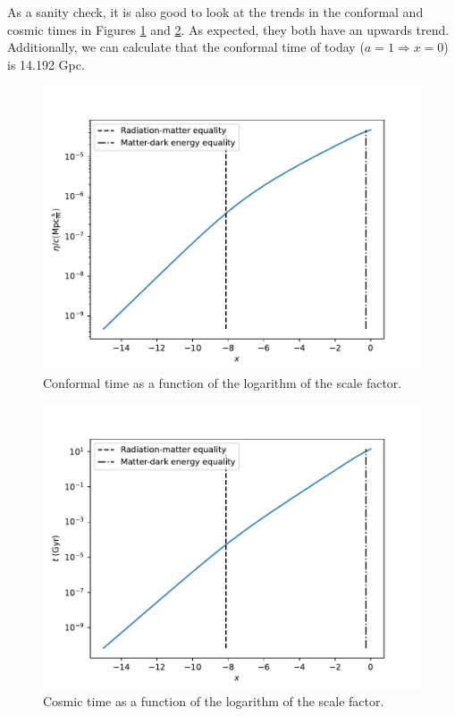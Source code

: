 \documentclass{aa}
\begin{document}
As a sanity check, it is also good to look at the trends in the conformal and cosmic times in Figures \ref{fig:eta} and \ref{fig:t}. As expected, they both have an upwards trend. Additionally, we can calculate that the conformal time of today ($a = 1 \Rightarrow x = 0$) is 14.192 Gpc.

\begin{figure}[ht]
\centering
\includegraphics[width=\hsize]{figures/eta_over_c.pdf}
  \caption{Conformal time as a function of the logarithm of the scale factor.}
     \label{fig:eta}
\end{figure}

\begin{figure}[ht]
\centering
\includegraphics[width=\hsize]{figures/t.pdf}
  \caption{Cosmic time as a function of the logarithm of the scale factor.}
     \label{fig:t}
\end{figure}
\end{document}
